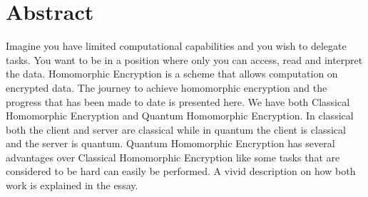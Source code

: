 
\chapter*{Abstract} 
Imagine you have limited computational capabilities and you wish to delegate tasks. You want to be in a position where only you can access, read and interpret the data. Homomorphic Encryption is a scheme that allows computation on encrypted data. The journey to achieve homomorphic encryption and the progress that has been made to date is presented here. We have both Classical Homomorphic Encryption and Quantum Homomorphic Encryption. In classical both the client and server are classical while in quantum the client is classical and the server is quantum.  Quantum Homomorphic Encryption has several advantages over Classical Homomorphic Encryption like some tasks that are considered to be hard can easily be performed. A vivid description on how both work is explained in the essay.





